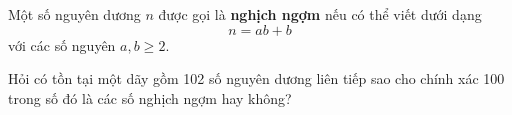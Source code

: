 \ifshowproblem
\begin{problem}\label{example:GER-2015-TST-P2}
    Một số nguyên dương \( n \) được gọi là \textbf{nghịch ngợm} nếu có thể viết dưới dạng
    \[
        n = ab + b
    \]
    với các số nguyên \( a, b \geq 2 \).

    Hỏi có tồn tại một dãy gồm 102 số nguyên dương liên tiếp sao cho chính xác 100 trong số đó là các số nghịch ngợm hay không?
\end{problem}
\fi

\footnotemark
{}
\fi